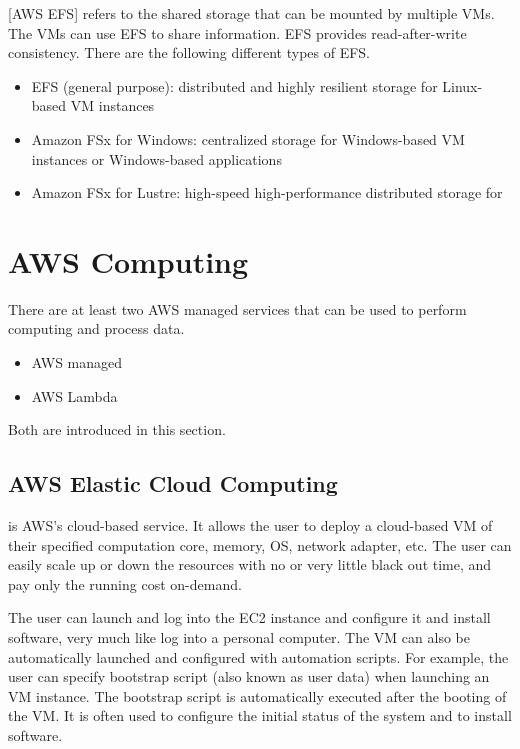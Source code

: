 [AWS EFS] refers to the shared storage that can be mounted by multiple VMs. The VMs can use EFS to share information. EFS provides read-after-write consistency. There are the following different types of EFS.
\begin{itemize}
	\item EFS (general purpose): distributed and highly resilient storage for Linux-based VM instances
	\item Amazon FSx for Windows: centralized storage for Windows-based VM instances or Windows-based applications
	\item Amazon FSx for Lustre: high-speed high-performance distributed storage for 
\end{itemize}

\section{AWS Computing}

There are at least two AWS managed services that can be used to perform computing and process data.
\begin{itemize}
	\item AWS managed 
	\item AWS Lambda
\end{itemize}
Both are introduced in this section.

\subsection{AWS Elastic Cloud Computing}

 is AWS's cloud-based  service. It allows the user to deploy a cloud-based VM of their specified computation core, memory, OS, network adapter, etc. The user can easily scale up or down the resources with no or very little black out time, and pay only the running cost on-demand. 

The user can launch and log into the EC2 instance and configure it and install software, very much like log into a personal computer. The VM can also be automatically launched and configured with automation scripts. For example, the user can specify bootstrap script (also known as user data) when launching an VM instance. The bootstrap script is automatically executed after the booting of the VM. It is often used to configure the initial status of the system and to install software.


